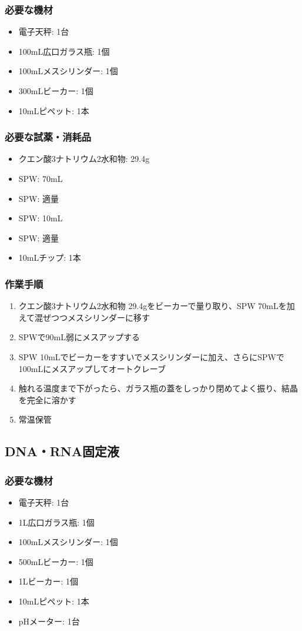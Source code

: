 \documentclass[titlepage,10pt,a4paper]{jsbook}
\begin{document}
\subsubsection{必要な機材}
\begin{itemize}
\item 電子天秤: 1台
\item 100mL広口ガラス瓶: 1個
\item 100mLメスシリンダー: 1個
\item 300mLビーカー: 1個
\item 10mLピペット: 1本
\end{itemize}

\subsubsection{必要な試薬・消耗品}
\begin{itemize}
\item クエン酸3ナトリウム2水和物: 29.4g
\item SPW: 70mL
\item SPW: 適量
\item SPW: 10mL
\item SPW: 適量
\item 10mLチップ: 1本
\end{itemize}

\subsubsection{作業手順}
\begin{enumerate}
\item クエン酸3ナトリウム2水和物 29.4gをビーカーで量り取り、SPW 70mLを加えて混ぜつつメスシリンダーに移す
\item SPWで90mL弱にメスアップする
\item SPW 10mLでビーカーをすすいでメスシリンダーに加え、さらにSPWで100mLにメスアップしてオートクレーブ
\item 触れる温度まで下がったら、ガラス瓶の蓋をしっかり閉めてよく振り、結晶を完全に溶かす
\item 常温保管
\end{enumerate}

\subsection{DNA・RNA固定液}

\subsubsection{必要な機材}
\begin{itemize}
\item 電子天秤: 1台
\item 1L広口ガラス瓶: 1個
\item 100mLメスシリンダー: 1個
\item 500mLビーカー: 1個
\item 1Lビーカー: 1個
\item 10mLピペット: 1本
\item pHメーター: 1台
\end{itemize}
\end{document}
